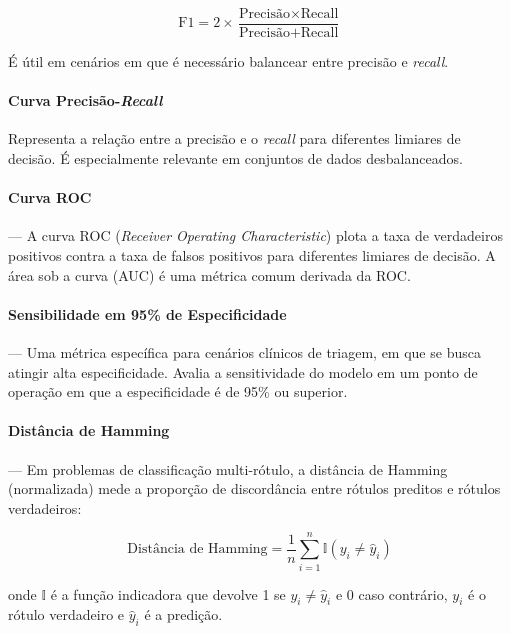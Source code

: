 \documentclass[12pt]{article}
\begin{document}
\begin{equation}
\text{F1} = 2 \times \frac{\text{Precisão} \times \text{Recall}}{\text{Precisão} + \text{Recall}}
\end{equation}

É útil em cenários em que é necessário balancear entre precisão e \emph{recall}.

\paragraph{Curva Precisão-\emph{Recall}} Representa a relação entre a precisão e o \emph{recall} para diferentes limiares de decisão. É especialmente relevante em conjuntos de dados desbalanceados.

\paragraph{Curva ROC} --- A curva ROC (\emph{Receiver Operating Characteristic}) plota a taxa de verdadeiros positivos contra a taxa de falsos positivos para diferentes limiares de decisão. A área sob a curva (AUC) é uma métrica comum derivada da ROC.

\paragraph{Sensibilidade em 95\% de Especificidade} --- Uma métrica específica para cenários clínicos de triagem, em que se busca atingir alta especificidade. Avalia a sensitividade do modelo em um ponto de operação em que a especificidade é de 95\% ou superior.

\paragraph{Distância de Hamming} ---
Em problemas de classificação multi-rótulo, a distância de Hamming (normalizada) mede a proporção de discordância entre rótulos preditos e rótulos verdadeiros:

\begin{equation}
\text{Distância de Hamming} = \frac{1}{n} \sum_{i=1}^{n} \mathbb{I}(y_i \neq \hat{y}_i)
\end{equation}

\noindent onde \( \mathbb{I} \) é a função indicadora que devolve 1 se \( y_i \neq \hat{y}_i \) e 0 caso contrário, \( y_i \) é o rótulo verdadeiro e \( \hat{y}_i \) é a predição.
\end{document}
